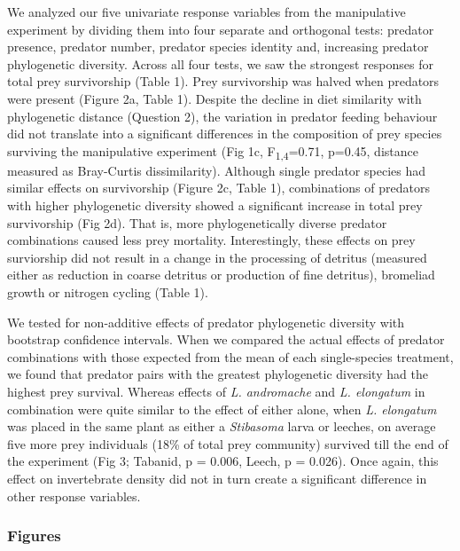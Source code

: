 We analyzed our five univariate response variables from the manipulative
experiment by dividing them into four separate and orthogonal tests:
predator presence, predator number, predator species identity and,
increasing predator phylogenetic diversity. Across all four tests, we
saw the strongest responses for total prey survivorship (Table 1). Prey
survivorship was halved when predators were present (Figure 2a, Table
1). Despite the decline in diet similarity with phylogenetic distance
(Question 2), the variation in predator feeding behaviour did not
translate into a significant differences in the composition of prey
species surviving the manipulative experiment (Fig 1c,
F\textsubscript{1,4}=0.71, p=0.45, distance measured as Bray-Curtis
dissimilarity). Although single predator species had similar effects on
survivorship (Figure 2c, Table 1), combinations of predators with higher
phylogenetic diversity showed a significant increase in total prey
survivorship (Fig 2d). That is, more phylogenetically diverse predator
combinations caused less prey mortality. Interestingly, these effects on
prey surviorship did not result in a change in the processing of
detritus (measured either as reduction in coarse detritus or production
of fine detritus), bromeliad growth or nitrogen cycling (Table 1).

We tested for non-additive effects of predator phylogenetic diversity
with bootstrap confidence intervals. When we compared the actual effects
of predator combinations with those expected from the mean of each
single-species treatment, we found that predator pairs with the greatest
phylogenetic diversity had the highest prey survival. Whereas effects of
\emph{L. andromache} and \emph{L. elongatum} in combination were quite
similar to the effect of either alone, when \emph{L. elongatum} was
placed in the same plant as either a \emph{Stibasoma} larva or leeches,
on average five more prey individuals (18\% of total prey community)
survived till the end of the experiment (Fig 3; Tabanid, p = 0.006,
Leech, p = 0.026). Once again, this effect on invertebrate density did
not in turn create a significant difference in other response variables.

\subsubsection{Figures}\label{figures}

